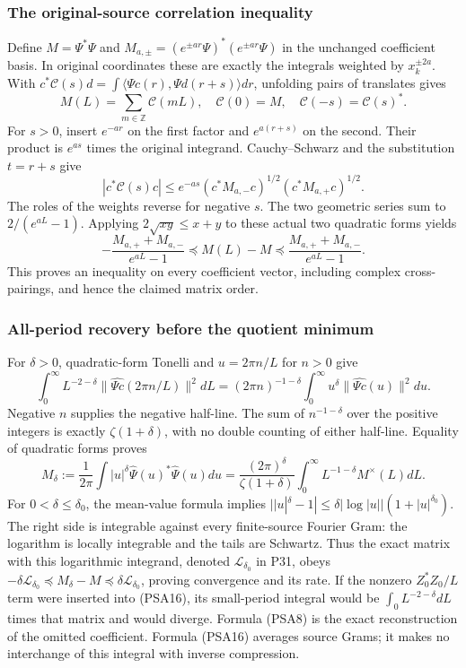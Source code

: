 \subsubsection{The original-source correlation inequality}

Define $M=\Psi^*\Psi$ and
$M_{a,\pm}=(e^{\pm ar}\Psi)^*(e^{\pm ar}\Psi)$ in the unchanged
coefficient basis. In original coordinates these are exactly the
integrals weighted by $x_k^{\pm2a}$. With
$c^*\mathcal C(s)d=\int\langle\Psi c(r),\Psi d(r+s)\rangle dr$,
unfolding pairs of translates gives
\[
 M(L)=\sum_{m\in\mathbb Z}\mathcal C(mL),\quad
 \mathcal C(0)=M,\quad\mathcal C(-s)=\mathcal C(s)^*.
 \tag{PSA12}
\]
For $s>0$, insert $e^{-ar}$ on the first factor and $e^{a(r+s)}$
on the second. Their product is $e^{as}$ times the original integrand.
Cauchy--Schwarz and the substitution $t=r+s$ give
\[
 |c^*\mathcal C(s)c|
 \le e^{-as}(c^*M_{a,-}c)^{1/2}(c^*M_{a,+}c)^{1/2}.
 \tag{PSA13}
\]
The roles of the weights reverse for negative $s$. The two geometric
series sum to $2/(e^{aL}-1)$. Applying
$2\sqrt{xy}\le x+y$ to these actual two quadratic forms yields
\[
 -\frac{M_{a,+}+M_{a,-}}{e^{aL}-1}
 \preceq M(L)-M\preceq
 \frac{M_{a,+}+M_{a,-}}{e^{aL}-1}.
 \tag{PSA14}
\]
This proves an inequality on every coefficient vector, including
complex cross-pairings, and hence the claimed matrix order.

\subsubsection{All-period recovery before the quotient minimum}

For $\delta>0$, quadratic-form Tonelli and
$u=2\pi n/L$ for $n>0$ give
\[
 \int_0^\infty L^{-2-\delta}
       \|\widehat{\Psi c}(2\pi n/L)\|^2dL
 =(2\pi n)^{-1-\delta}\int_0^\infty
       u^\delta\|\widehat{\Psi c}(u)\|^2du.
 \tag{PSA15}
\]
Negative $n$ supplies the negative half-line. The sum of
$n^{-1-\delta}$ over the positive integers is exactly
$\zeta(1+\delta)$, with no double counting of either half-line.
Equality of quadratic forms proves
\[
 M_\delta:=\frac1{2\pi}\int|u|^\delta
       \widehat\Psi(u)^*\widehat\Psi(u)du
 =\frac{(2\pi)^\delta}{\zeta(1+\delta)}
       \int_0^\infty L^{-1-\delta}M^\times(L)dL.
 \tag{PSA16}
\]
For $0<\delta\le\delta_0$, the mean-value formula implies
$||u|^\delta-1|\le\delta|\log|u||
(1+|u|^{\delta_0})$. The right side is integrable against every
finite-source Fourier Gram: the logarithm is locally integrable and
the tails are Schwartz. Thus the exact matrix with this logarithmic
integrand, denoted $\mathcal L_{\delta_0}$ in P31, obeys
$-\delta\mathcal L_{\delta_0}\preceq M_\delta-M
\preceq\delta\mathcal L_{\delta_0}$, proving convergence and its rate.
If the nonzero $Z_0^*Z_0/L$ term were inserted into (PSA16), its
small-period integral would be $\int_0 L^{-2-\delta}dL$ times that
matrix and would diverge. Formula (PSA8) is the exact reconstruction
of the omitted coefficient. Formula (PSA16) averages source Grams;
it makes no interchange of this integral with inverse compression.

